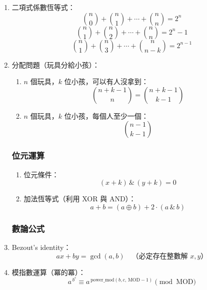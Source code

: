\begin{enumerate}
\item 二項式係數恆等式：
\[
\binom{n}{0} + \binom{n}{1} + \cdots + \binom{n}{n} = 2^n
\]
\[
\binom{n}{1} + \binom{n}{2} + \cdots + \binom{n}{n} = 2^n - 1
\]
\[
\binom{n}{1} + \binom{n}{3} + \cdots + \binom{n}{n - k} = 2^{n - 1}
\]

\item 分配問題（玩具分給小孩）：
\begin{enumerate}\itemsep = -3pt
\item $n$ 個玩具，$k$ 位小孩，可以有人沒拿到：
\[
\binom{n+k-1}{n} = \binom{n+k-1}{k-1}
\]
\item $n$ 個玩具，$k$ 位小孩，每個人至少一個：
\[
\binom{n-1}{k-1}
\]
\end{enumerate}

\subsubsection{位元運算}
\begin{enumerate}\itemsep = -3pt
\item 位元條件：
\[
(x + k) \,\&\, (y + k) = 0
\]

\item 加法恆等式（利用 XOR 與 AND）：
\[
a + b = (a \oplus b) + 2 \cdot (a \,\&\, b)
\]
\end{enumerate}

\subsubsection{數論公式}
\item Bezout's identity：
\[
ax + by = \gcd(a, b) \quad \text{（必定存在整數解 $x, y$）}
\]

\item 模指數運算（冪的冪）：
\[
a^{\,b^c} \equiv a^{\,\text{power\_mod}(b, c, \, \text{MOD}-1)} \pmod{\text{MOD}}
\]
\end{enumerate}


%